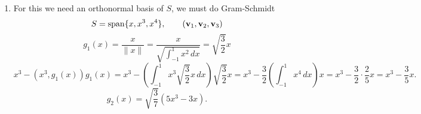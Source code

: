 \documentclass[10pt, a4paper]{article}
\begin{document}
\begin{problem}
\begin{solution}
\begin{enumerate}[label = (\alph*)]
            \item For this we need an orthonormal basis of $S$,
            we must do Gram-Schmidt
            \[
            S = \mathrm{span}\{x, x ^ 3, x ^ 4\},\qquad(\mathbf{v}_1, \mathbf{v}_2, \mathbf{v}_3)
            \]
            \[
            g_1(x) = \frac{x}{\|x\|} = \frac{x}{\sqrt{\int_{-1}^{1}x ^ 2\,dx}} = \sqrt{\frac{3}{2}}x
            \]
            \[
            x ^ 3 - (x ^ 3, g_1(x))g_1(x) = x ^ 3 - \left(\int_{-1}^{1}x ^ 3\sqrt{\frac{3}{2}}x\,dx\right)\sqrt{\frac{3}{2}}x = x ^ 3 - \frac{3}{2}\left(\int_{-1}^{1}x ^ 4\,dx\right)x = x ^ 3 - \frac{3}{2}\cdot\frac{2}{5}x = x ^ 3 - \frac{3}{5}x.
            \]
            \[
            g_2(x) = \sqrt{\frac{3}{7}}(5x ^ 3 - 3x).
            \]
            
        \end{enumerate}
    \end{solution}
\end{problem}
\end{document}
